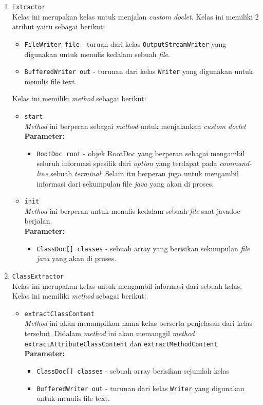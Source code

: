 \begin{enumerate}
	\item {\texttt{Extractor}}\\
	Kelas ini merupakan kelas untuk menjalan {\it custom doclet}. Kelas ini memiliki 2 atribut yaitu sebagai berikut:
	\begin{itemize}
		\item \texttt{FileWriter file} - turuan dari kelas \texttt{OutputStreamWriter} yang digunakan untuk menulis kedalam sebuah {\it file}.
		\item \texttt{BufferedWriter out} - turunan dari kelas \texttt{Writer} yang digunakan untuk menulis file text.
	\end{itemize}
	Kelas ini memiliki {\it method} sebagai berikut:
	\begin{itemize}
		\item \texttt{start}\\
		{\it Method} ini berperan sebagai {\it method} untuk menjalankan {\it custom doclet}\\
		\textbf{Parameter:}
		\begin{itemize}
			\item \texttt{RootDoc root} - objek RootDoc yang berperan sebagai mengambil seluruh informasi spesifik dari {\it option} yang terdapat pada {\it command-line} sebuah {\it terminal}. Selain itu berperan juga untuk mengambil informasi dari sekumpulan file {\it java} yang akan di proses.
		\end{itemize}
		\item \texttt{init}\\
		{\it Method} ini berperan untuk menulis kedalam sebuah {\it file} saat javadoc berjalan.\\
		\textbf{Parameter:}
		\begin{itemize}
			\item \texttt{ClassDoc[] classes} - sebuah array yang berisikan sekumpulan {\it file java} yang akan di proses.
		\end{itemize}
	\end{itemize}

	\item {\texttt{ClassExtractor}}\\
	Kelas ini merupakan kelas untuk mengambil informasi dari sebuah kelas. Kelas ini memiliki {\it method} sebagai berikut:
	\begin{itemize}
		\item \texttt{extractClassContent}\\
		{\it Method} ini akan menampilkan nama kelas berserta penjelasan dari kelas tersebut. Didalam {\it method} ini akan memanggil {\it method} \texttt{extractAttributeClassContent} dan \texttt{extractMethodContent}\\
		\textbf{Parameter:}
		\begin{itemize}
			\item \texttt{ClassDoc[] classes} - sebuah array berisikan sejumlah kelas
			\item \texttt{BufferedWriter out} - turunan dari kelas \texttt{Writer} yang digunakan untuk menulis file text.
		\end{itemize}
	\end{itemize}
		 

\end{enumerate}

